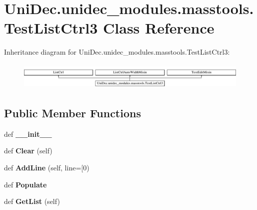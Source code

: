\hypertarget{class_uni_dec_1_1unidec__modules_1_1masstools_1_1_test_list_ctrl3}{}\section{Uni\+Dec.\+unidec\+\_\+modules.\+masstools.\+Test\+List\+Ctrl3 Class Reference}
\label{class_uni_dec_1_1unidec__modules_1_1masstools_1_1_test_list_ctrl3}
Inheritance diagram for Uni\+Dec.\+unidec\+\_\+modules.\+masstools.\+Test\+List\+Ctrl3\+:\begin{figure}[H]
\begin{center}
\leavevmode
\includegraphics[height=1.300813cm]{class_uni_dec_1_1unidec__modules_1_1masstools_1_1_test_list_ctrl3}
\end{center}
\end{figure}
\subsection*{Public Member Functions}
\begin{DoxyCompactItemize}
\item 
\hypertarget{class_uni_dec_1_1unidec__modules_1_1masstools_1_1_test_list_ctrl3_ad42335443fbbee02970bd2d292b9ad8b}{}def {\bfseries \+\_\+\+\_\+init\+\_\+\+\_\+}\label{class_uni_dec_1_1unidec__modules_1_1masstools_1_1_test_list_ctrl3_ad42335443fbbee02970bd2d292b9ad8b}

\item 
\hypertarget{class_uni_dec_1_1unidec__modules_1_1masstools_1_1_test_list_ctrl3_a3ce375d10a926256db16ac041c4ae7cd}{}def {\bfseries Clear} (self)\label{class_uni_dec_1_1unidec__modules_1_1masstools_1_1_test_list_ctrl3_a3ce375d10a926256db16ac041c4ae7cd}

\item 
\hypertarget{class_uni_dec_1_1unidec__modules_1_1masstools_1_1_test_list_ctrl3_a2c35ba2bf0ab3a620985fa0906dc9644}{}def {\bfseries Add\+Line} (self, line=\mbox{[}0)\label{class_uni_dec_1_1unidec__modules_1_1masstools_1_1_test_list_ctrl3_a2c35ba2bf0ab3a620985fa0906dc9644}

\item 
\hypertarget{class_uni_dec_1_1unidec__modules_1_1masstools_1_1_test_list_ctrl3_a785e4886d3d4198c667c33d39a0a7481}{}def {\bfseries Populate}\label{class_uni_dec_1_1unidec__modules_1_1masstools_1_1_test_list_ctrl3_a785e4886d3d4198c667c33d39a0a7481}

\item 
\hypertarget{class_uni_dec_1_1unidec__modules_1_1masstools_1_1_test_list_ctrl3_a8a7b995924fb2233ed66813910cfd524}{}def {\bfseries Get\+List} (self)\label{class_uni_dec_1_1unidec__modules_1_1masstools_1_1_test_list_ctrl3_a8a7b995924fb2233ed66813910cfd524}

\end{DoxyCompactItemize}
